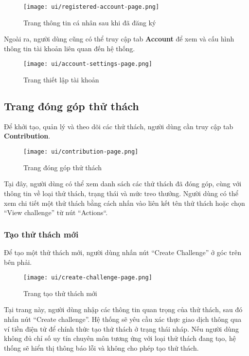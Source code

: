 \begin{figure}[H]
  \centering
  \texttt{[image: ui/registered-account-page.png]}
  \caption{Trang thông tin cá nhân sau khi đã đăng ký}
  \label{fig:registered-account-page}
\end{figure}

Ngoài ra, người dùng cũng có thể truy cập tab \textbf{Account} để xem và cấu hình thông tin tài khoản liên quan đến hệ thống.

\begin{figure}[H]
  \centering
  \texttt{[image: ui/account-settings-page.png]}
  \caption{Trang thiết lập tài khoản}
  \label{fig:account-settings-page}
\end{figure}

\subsection{Trang đóng góp thử thách}

Để khởi tạo, quản lý và theo dõi các thử thách, người dùng cần truy cập tab \textbf{Contribution}.

\begin{figure}[H]
  \centering
  \texttt{[image: ui/contribution-page.png]}
  \caption{Trang đóng góp thử thách}
  \label{fig:contribution-page}
\end{figure}

Tại đây, người dùng có thể xem danh sách các thử thách đã đóng góp, cùng với thông tin về loại thử thách, trạng thái và mức treo thưởng.  
Người dùng có thể xem chi tiết một thử thách bằng cách nhấn vào liên kết tên thử thách hoặc chọn ``View challenge'' từ nút ``Actions``.

\subsubsection{Tạo thử thách mới}

Để tạo một thử thách mới, người dùng nhấn nút ``Create Challenge'' ở góc trên bên phải.

\begin{figure}[H]
  \centering
  \texttt{[image: ui/create-challenge-page.png]}
  \caption{Trang tạo thử thách mới}
  \label{fig:create-challenge-page}
\end{figure}

Tại trang này, người dùng nhập các thông tin quan trọng của thử thách, sau đó nhấn nút ``Create challenge''.  
Hệ thống sẽ yêu cầu xác thực giao dịch thông qua ví tiền điện tử để chính thức tạo thử thách ở trạng thái nháp.
Nếu người dùng không đủ chỉ số uy tín chuyên môn tương ứng với loại thử thách đang tạo, hệ thống sẽ hiển thị thông báo lỗi và không cho phép tạo thử thách.

